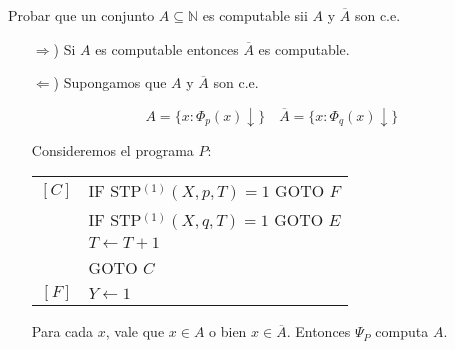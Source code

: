 \begin{questions}
\begin{solution}
\begin{enumerate}[(a)]
 \end{enumerate}

\end{solution}

\question Probar que un conjunto $A\subseteq \mathbb{N}$ es computable sii $A$ y $\overline{A}$ son c.e.

\begin{solution}
\begin{itemize}
 \item[$\Rightarrow$)] Si $A$ es computable entonces $\overline{A}$ es computable. 
 
 \item[$\Leftarrow$)] Supongamos que $A$ y $\overline{A}$ son c.e.
 
 \begin{equation*}
  A = \{x : \Phi_p(x)\downarrow \} \quad \overline{A} = \{x : \Phi_q(x)\downarrow \}
 \end{equation*}
 
 Consideremos el programa $P$: 
 
  \vspace{0.5cm}
  \begin{tabular}{rl}
    $[C]$ & IF STP$^{(1)}(X,p,T) = 1$ GOTO $F$ \\
	  & IF STP$^{(1)}(X,q,T) = 1$ GOTO $E$ \\
	  & $T\leftarrow T+1$ \\
	  & GOTO $C$ \\
    $[F]$ & $Y\leftarrow 1$ \\
  \end{tabular}
  \vspace{0.5cm}

  Para cada $x$, vale que $x\in A$ o bien $x\in\overline{A}$. Entonces $\Psi_P$ computa $A$. 
\end{itemize}

\end{solution}

\end{questions}